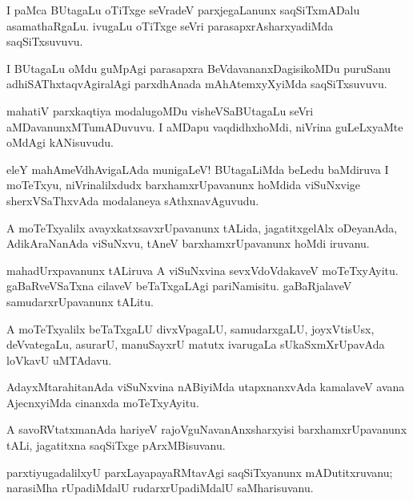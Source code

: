 \documentclass{article}
\begin{document}
\begin{mn}
I paMca BUtagaLu oTiTxge seVradeV parxjegaLanunx saqSiTxmADalu asamathaRgaLu.
ivugaLu oTiTxge seVri parasapxrAsharxyadiMda saqSiTxsuvuvu.
\end{mn}

\begin{mn}
I BUtagaLu oMdu guMpAgi parasapxra BeVdavananxDagisikoMDu puruSanu 
adhiSAThxtaqvAgiralAgi parxdhAnada mAhAtemxyXyiMda saqSiTxsuvuvu.
\end{mn}

\begin{mn}
mahatiV parxkaqtiya modalugoMDu visheVSaBUtagaLu seVri aMDavanunxMTumADuvuvu.
I aMDapu vaqdidhxhoMdi, niVrina guLeLxyaMte oMdAgi kANisuvudu.
\end{mn}

\begin{mn}
eleY mahAmeVdhAvigaLAda munigaLeV! BUtagaLiMda beLedu baMdiruva I moTeTxyu, 
niVrinalilxdudx barxhamxrUpavanunx hoMdida viSuNxvige sherxVSaThxvAda modalaneya sAthxnavAguvudu.
\end{mn}

\begin{mn}
A moTeTxyalilx avayxkatxsavxrUpavanunx tALida, jagatitxgelAlx oDeyanAda, 
AdikAraNanAda viSuNxvu, tAneV barxhamxrUpavanunx hoMdi iruvanu.
\end{mn}

\begin{mn}
mahadUrxpavanunx tALiruva A viSuNxvina sevxVdoVdakaveV moTeTxyAyitu. 
gaBaRveVSaTxna cilaveV beTaTxgaLAgi pariNamisitu.
gaBaRjalaveV samudarxrUpavanunx tALitu.
\end{mn}

\begin{mn}
A moTeTxyalilx beTaTxgaLU divxVpagaLU, samudarxgaLU, joyxVtisUsx, deVvategaLu,
asurarU, manuSayxrU matutx ivarugaLa sUkaSxmXrUpavAda loVkavU uMTAdavu.
\end{mn}

\begin{mn}
AdayxMtarahitanAda viSuNxvina nABiyiMda utapxnanxvAda kamalaveV avana 
AjecnxyiMda cinanxda moTeTxyAyitu.
\end{mn} 

\begin{mn}
A savoRVtatxmanAda hariyeV rajoVguNavanAnxsharxyisi barxhamxrUpavanunx tALi, 
jagatitxna saqSiTxge pArxMBisuvanu. 
\end{mn}

\begin{mn}
parxtiyugadalilxyU parxLayapayaRMtavAgi saqSiTxyanunx mADutitxruvanu; 
narasiMha rUpadiMdalU rudarxrUpadiMdalU saMharisuvanu.
\end{mn}
\end{document}

